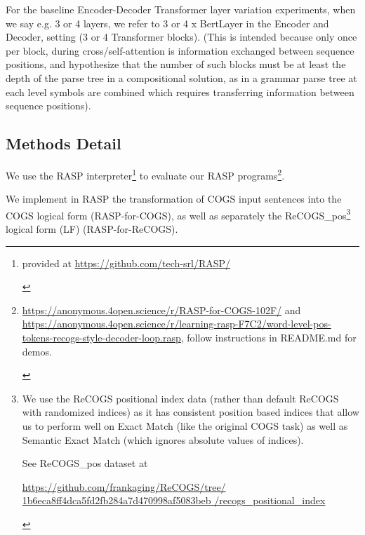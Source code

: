 \documentclass[11pt]{article}
\begin{document}
For the \cite{Wu2023} baseline Encoder-Decoder Transformer layer variation experiments, 
when we say e.g. 3 or 4 layers, we refer to 3 or 4 x BertLayer in the Encoder and Decoder, setting (3 or 4 Transformer blocks).
(This is intended because only once per block, during cross/self-attention is information exchanged between sequence positions, and \cite{Csordas2022} hypothesize that the number of such blocks must be at least the depth of the parse tree in a compositional solution, as in a grammar parse tree at each level symbols are combined which requires transferring information between sequence positions).

\subsection{Methods Detail}
\label{methods_detail}

We use the RASP \cite{Weiss2021} interpreter\footnote{\begin{footnotesize}provided at \href{https://github.com/tech-srl/RASP/}{https://github.com/tech-srl/RASP/}
\end{footnotesize}
} to evaluate our RASP programs\footnote{\begin{footnotesize}\href{https://anonymous.4open.science/r/RASP-for-COGS-102F/}{https://anonymous.4open.science/r/RASP-for-COGS-102F/} and \href{https://anonymous.4open.science/r/learning-rasp-F7C2/word-level-pos-tokens-recogs-style-decoder-loop.rasp}{https://anonymous.4open.science/r/learning-rasp-F7C2/word-level-pos-tokens-recogs-style-decoder-loop.rasp}, follow instructions in README.md for demos.\end{footnotesize}}.

We implement in RASP the transformation of COGS input sentences into the COGS logical form (RASP-for-COGS), as well as separately the ReCOGS\_pos\footnote{
\begin{footnotesize}We use the ReCOGS positional index data (rather than default ReCOGS with randomized indices) as it has consistent position based indices that allow us to perform well on Exact Match (like the original COGS task) as well as Semantic Exact Match (which ignores absolute values of indices).

See ReCOGS\_pos dataset at 

\href{https://github.com/frankaging/ReCOGS/tree/1b6eca8ff4dca5fd2fb284a7d470998af5083beb/recogs\_positional\_index}{https://github.com/frankaging/ReCOGS/tree/
1b6eca8ff4dca5fd2fb284a7d470998af5083beb
/recogs\_positional\_index}\end{footnotesize}
} logical form (LF) (RASP-for-ReCOGS).
\end{document}
